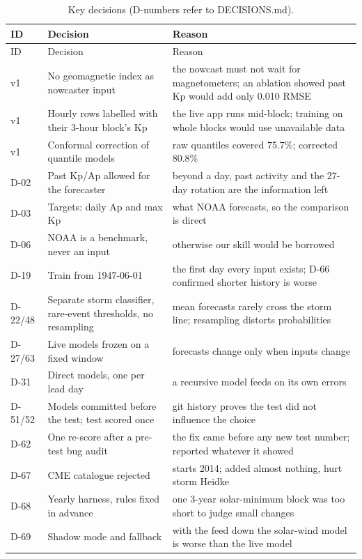 \documentclass[11pt,a4paper]{article}
\begin{document}
{\small
\begin{longtable}{@{}p{1.3cm}p{5.6cm}p{9.4cm}@{}}
\caption{Key decisions (D-numbers refer to DECISIONS.md).}\label{tab:dec}\\\toprule
ID & Decision & Reason\\\midrule\endfirsthead
\toprule ID & Decision & Reason\\\midrule\endhead
v1 & No geomagnetic index as nowcaster input & the nowcast must not wait for magnetometers; an ablation showed past Kp would add only 0.010 RMSE\\
v1 & Hourly rows labelled with their 3-hour block's Kp & the live app runs mid-block; training on whole blocks would use unavailable data\\
v1 & Conformal correction of quantile models \cite{romano2019} & raw quantiles covered 75.7\%; corrected 80.8\%\\
D-02 & Past Kp/Ap allowed for the forecaster & beyond a day, past activity and the 27-day rotation are the information left\\
D-03 & Targets: daily Ap and max Kp & what NOAA forecasts, so the comparison is direct\\
D-06 & NOAA is a benchmark, never an input & otherwise our skill would be borrowed\\
D-19 & Train from 1947-06-01 & the first day every input exists; D-66 confirmed shorter history is worse\\
D-22/48 & Separate storm classifier, rare-event thresholds, no resampling & mean forecasts rarely cross the storm line; resampling distorts probabilities\\
D-27/63 & Live models frozen on a fixed window & forecasts change only when inputs change\\
D-31 & Direct models, one per lead day & a recursive model feeds on its own errors\\
D-51/52 & Models committed before the test; test scored once & git history proves the test did not influence the choice\\
D-62 & One re-score after a pre-test bug audit & the fix came before any new test number; reported whatever it showed\\
D-67 & CME catalogue rejected & starts 2014; added almost nothing, hurt storm Heidke\\
D-68 & Yearly harness, rules fixed in advance & one 3-year solar-minimum block was too short to judge small changes\\
D-69 & Shadow mode and fallback & with the feed down the solar-wind model is worse than the live model\\

\end{longtable}}
\end{document}

